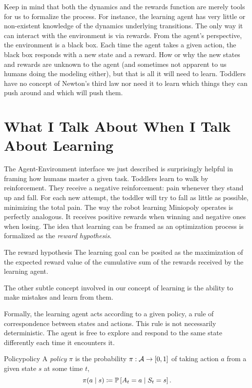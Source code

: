 Keep in mind that both the dynamics and the rewards function are merely tools
for us to formalize the process. For instance, the learning agent has very
little or non-existent knowledge of the dynamics underlying transitions. The
only way it can interact with the environment is via rewards. From the agent's
perspective, the environment is a black box. Each time the agent takes a given
action, the black box responds with a new state and a reward. How or why the new
states and rewards are unknown to the agent (and sometimes not apparent to us
humans doing the modeling either), but that is all it will need to learn.
Toddlers have no concept of Newton's third law nor need it to learn which things
they can push around and which will push them.

\section{What I Talk About When I Talk About Learning} The Agent-Environment
interface we just described is surprisingly helpful in framing how humans master
a given task. Toddlers learn to walk by reinforcement.  They receive a negative
reinforcement: pain whenever they stand up and fall.  For each new attempt, the
toddler will try to fall as little as possible, minimizing the total pain. The
way the robot learning Miniopoly operates is perfectly analogous. It receives
positive rewards when winning and negative ones when losing.  The idea that
learning can be framed as an optimization process is formalized as the
\emph{reward hypothesis}.

\begin{remark}{The reward hypothesis}
	The learning goal can be posited as the maximization of the expected reward
	value of the cumulative sum of the rewards received by the learning agent. 
\end{remark}

The other subtle concept involved in our concept of learning is the
ability to make mistakes and learn from them.

Formally, the learning agent acts according to a given policy, a rule of
correspondence between states and actions. This rule is not necessarily
deterministic. The agent is free to explore and respond to the same state
differently each time it encounters it.

\begin{dfn}{Policy}{policy}
	A \emph{policy} $\pi$ is the probability $\pi: \mathcal{A} \to [0,1]$ of taking
	action $a$ from a given state $s$ at some time $t$,
	\[
		\pi(a \mid s) \coloneqq \mathbb{P}\left[A_t = a \mid S_t = s\right].
	\]
\end{dfn}

